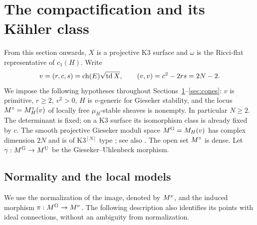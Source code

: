 \section{The compactification and its K\"ahler class}\label{sec:compactification}

From this section onwards, $X$ is a projective K3 surface and $\omega$ is the
Ricci-flat representative of $c_1(H)$. Write
\[
 v=(r,c,s)=\operatorname{ch}(E)\sqrt{\operatorname{td}X},\qquad
 (v,v)=c^2-2rs=2N-2.
\]
We impose the following hypotheses throughout Sections~\ref{sec:compactification}--\ref{sec:cones}:
$v$ is primitive, $r\ge2$, $v^2>0$, $H$ is $v$-generic for Gieseker
stability, and the locus $M^{\circ}=M^{\circ}_H(v)$ of locally free $\mu_H$-stable
sheaves is nonempty. In particular $N\ge2$.
The determinant is fixed; on a K3 surface its isomorphism class is already
fixed by $c$. The smooth projective Gieseker moduli space
$M^{\mathrm G}=M_H(v)$ has complex dimension $2N$ and is of K3$^{[N]}$ type
\cite[Theorem~0.1]{Yos01}; see also \cite[Appendix, Theorem~8.1]{YosDeform01}. The open set $M^{\circ}$ is dense.
Let $\gamma:M^{\mathrm G}\to M^{\mathrm U}$ be the Gieseker--Uhlenbeck morphism.

\subsection{Normality and the local models}
We use the normalization of the image, denoted by $M^{\nu}$, and the induced
morphism $\pi:M^{\mathrm G}\to M^{\nu}$. The following description also identifies its
points with ideal connections, without an ambiguity from normalization.

